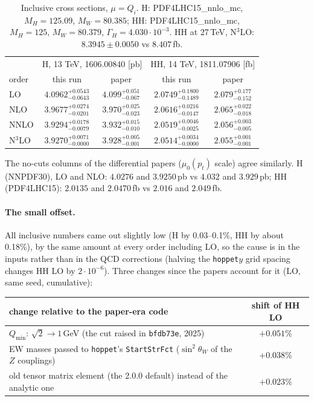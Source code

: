 \documentclass[11pt,a4paper]{article}
\newcommand{\hoppet}{\texttt{hoppet}\xspace}
\newcommand{\commit}[1]{\texttt{#1}}
\begin{document}
\begin{table}[h]
\centering
\begin{tabular}{lcc@{\hspace{2em}}cc}
\toprule
 & \multicolumn{2}{c}{H, 13 TeV, 1606.00840 [pb]} & \multicolumn{2}{c}{HH, 14 TeV, 1811.07906 [fb]}\\
order & this run & paper & this run & paper\\
\midrule
LO      & $4.0962^{+0.0543}_{-0.0643}$ & $4.099^{+0.051}_{-0.067}$ & $2.0749^{+0.1800}_{-0.1489}$ & $2.079^{+0.177}_{-0.152}$\\[2pt]
NLO     & $3.9677^{+0.0274}_{-0.0201}$ & $3.970^{+0.025}_{-0.023}$ & $2.0616^{+0.0216}_{-0.0147}$ & $2.065^{+0.022}_{-0.018}$\\[2pt]
NNLO    & $3.9294^{+0.0178}_{-0.0079}$ & $3.932^{+0.015}_{-0.010}$ & $2.0519^{+0.0046}_{-0.0025}$ & $2.056^{+0.003}_{-0.005}$\\[2pt]
N$^3$LO & $3.9270^{+0.0071}_{-0.0000}$ & $3.928^{+0.005}_{-0.001}$ & $2.0514^{+0.0034}_{-0.0000}$ & $2.055^{+0.001}_{-0.001}$\\
\bottomrule
\end{tabular}
\caption{Inclusive cross sections, $\mu=Q_i$. H: PDF4LHC15\_nnlo\_mc,
  $M_H=125.09$, $M_W=80.385$; HH: PDF4LHC15\_nnlo\_mc, $M_H=125$,
  $M_W=80.379$, $\Gamma_H=4.030\cdot10^{-3}$. HH at 27\,TeV, N$^3$LO:
  $8.3945\pm0.0050$ vs $8.407$\,fb.}
\end{table}

The no-cuts columns of the differential papers ($\mu_0(p_t)$ scale)
agree similarly. H (NNPDF30), LO and NLO: $4.0276$ and $3.9250$\,pb
vs $4.032$ and $3.929$\,pb; HH (PDF4LHC15): $2.0135$ and $2.0470$\,fb
vs $2.016$ and $2.049$\,fb.

\paragraph{The small offset.}
All inclusive numbers came out slightly low (H by 0.03--0.1\%, HH by
about 0.18\%), by the same amount at every order including LO, so the
cause is in the inputs rather than in the QCD corrections (halving the
\hoppet $y$ grid spacing changes HH LO by $2\cdot10^{-6}$). Three
changes since the papers account for it (LO, same seed, cumulative):

\begin{center}
\begin{tabular}{lc}
\toprule
change relative to the paper-era code & shift of HH LO\\
\midrule
$Q_{\min}$: $\sqrt2 \to 1$\,GeV (the cut raised in \commit{bfdb73e}, 2025) & $+0.051\%$\\
EW masses passed to \hoppet's \texttt{StartStrFct} ($\sin^2\theta_W$ of the $Z$ couplings) & $+0.038\%$\\
old tensor matrix element (the 2.0.0 default) instead of the analytic one & $+0.023\%$\\
\bottomrule
\end{tabular}
\end{center}
\end{document}
